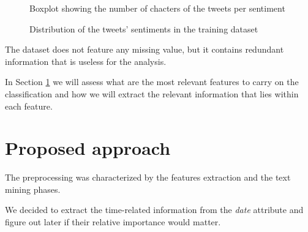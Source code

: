 \documentclass[conference]{IEEEtran}
\begin{document}
\begin{figure}[h]
        \centering
        
        \caption{Boxplot showing the number of chacters of the tweets per sentiment}
        \label{fig:charcount}
\end{figure}
\begin{figure}[h]
        \centering
        
        \caption{Distribution of the tweets' sentiments in the training dataset}
        \label{fig:unbalanced}
\end{figure}
The dataset does not feature any missing value, but it contains redundant information that is useless for the analysis.

In Section \ref{sec:approach} we will assess what are the most relevant features to carry on the classification and how we will extract the relevant information that lies within each feature.

\section{Proposed approach}\label{sec:approach}
The preprocessing was characterized by the features extraction and the text mining phases.

We decided to extract the time-related information from the \textit{date} attribute and figure out later if their relative importance would matter.
\end{document}
